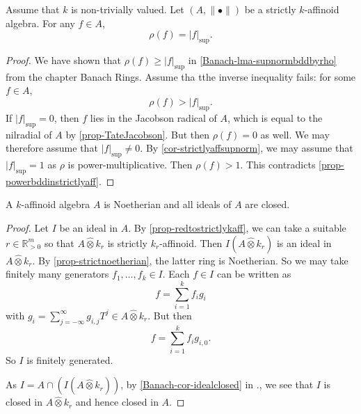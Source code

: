 \begin{corollary}\label{cor-rhoequsup}
    Assume that $k$ is non-trivially valued.
    Let $(A,\|\bullet\|)$ be a strictly $k$-affinoid algebra. For any $f\in A$,
    \[
        \rho(f)=|f|_{\sup}.  
    \]
\end{corollary}
\begin{proof}
    We have shown that $\rho(f)\geq |f|_{\sup}$ in \cref{Banach-lma-supnormbddbyrho} from the chapter Banach Rings. 
    Assume tha tthe inverse inequality fails: for some $f\in A$,
    \[
        \rho(f)> |f|_{\sup}.
    \]
    If $|f|_{\sup}=0$, then $f$ lies in the Jacobson radical of $A$, which is equal to the nilradial of $A$ by \cref{prop-TateJacobson}. But then $\rho(f)=0$ as well. We may therefore assume that $|f|_{\sup}\neq 0$.
    By \cref{cor-strictlyaffsupnorm}, we may assume that $|f|_{\sup}=1$ as $\rho$ is power-multiplicative. Then $\rho(f)>1$. This contradicts \cref{prop-powerbddinstrictlyaff}.
\end{proof}

\begin{thm}\label{thm-affnoetherian}
A $k$-affinoid algebra $A$ is Noetherian and all ideals of $A$ are closed.  
\end{thm}
\begin{proof}
    Let $I$ be an ideal in $A$. 
    By \cref{prop-redtostrictlykaff}, we can take a suitable $r\in \mathbb{R}^m_{>0}$ so that $A\hat{\otimes} k_r$ is strictly $k_r$-affinoid. Then $I (A\hat{\otimes} k_r)$ is an ideal in $A\hat{\otimes} k_r$. By \cref{prop-strictnoetherian}, the latter ring is Noetherian. So we may take finitely many generators $f_1,\ldots,f_k\in I$. Each $f\in I$ can be written as 
    \[
        f=\sum_{i=1}^k f_i g_i  
    \]
    with $g_i=\sum_{j=-\infty}^{\infty}g_{i,j}T^j\in A\hat{\otimes} k_r$. But then 
    \[
        f=\sum_{i=1}^k f_i g_{i,0}.  
    \]
    So $I$ is finitely generated.

    As $I=A\cap (I (A\hat{\otimes} k_r))$, by \cref{Banach-cor-idealclosed} in ., we see that $I$ is closed in $A\hat{\otimes} k_r$ and hence closed in $A$.
\end{proof}


